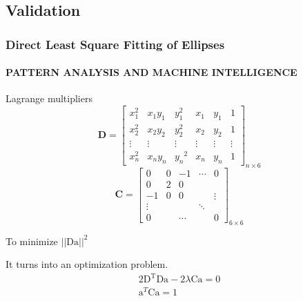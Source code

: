\documentclass[aspectratio=169]{beamer}
\begin{document}
    \subsection{Validation}
    \begin{frame}[allowframebreaks]
        \frametitle{Direct Least Square Fitting of Ellipses}
        \framesubtitle{PATTERN ANALYSIS AND MACHINE INTELLIGENCE}
        Lagrange multipliers
        $$
        \mathbf{D}=\left[\begin{array}{cccccc}
        x_{1}^{2} & x_{1} y_{1} & y_{1}^{2} & x_{1} & y_{1} & 1 \\
        x_{2}^{2} & x_{2} y_{2} & y_{2}^{2} & x_{2} & y_{2} & 1 \\
        \vdots & \vdots & \vdots & \vdots & \vdots & \vdots \\
        x_{n}^{2} & x_{n} y_{n} & y_{n}{ }^{2} & x_{n} & y_{n} & 1
        \end{array}\right]_{n \times 6}
        $$
        $$
        \mathbf{C}=\left[\begin{array}{ccccc}
        0 & 0 & -1 & \cdots & 0 \\
        0 & 2 & 0 & & \\
        -1 & 0 & 0 & & \vdots \\
        \vdots & & & \ddots & \\
        0 & & \cdots & & 0
        \end{array}\right]_{6 \times 6}
        $$

        \framebreak

        To minimize $||\mathrm{D} \mathrm{a}||^2$

        It turns into an optimization problem.
        $$
        \begin{array}{r}
        2 \mathrm{D}^{\mathrm{T}} \mathrm{D} \mathrm{a}-2 \lambda \mathrm{Ca}=0 \\
        \mathrm{a}^{T} \mathrm{Ca}=1
        \end{array}
        $$
    \end{frame}
\end{document}
